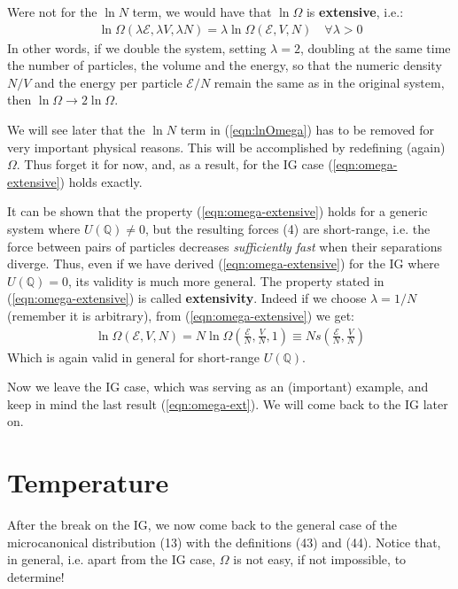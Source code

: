 \documentclass[../../main.tex]{subfiles}
\begin{document}
Were not for the $\ln N$ term, we would have that $\ln \Omega$ is \textbf{extensive}, i.e.:
\begin{align}\label{eqn:omega-extensive}
    \ln \Omega(\lambda \mathcal{E}, \lambda V, \lambda N) = \lambda \ln \Omega(\mathcal{E}, V, N) \quad \forall \lambda > 0
\end{align} 
In other words, if we double the system, setting $\lambda=2$, doubling at the same time the number of particles, the volume and the energy, so that the numeric density $N/V$ and the energy per particle $\mathcal{E}/N$ remain the same as in the original system, then $\ln \Omega \to 2 \ln \Omega$.

\medskip

We will see later that the $\ln N$ term in (\ref{eqn:lnOmega}) has to be removed for very important physical reasons. This will be accomplished by redefining (again) $\Omega$. Thus forget it for now, and, as a result, for the IG case (\ref{eqn:omega-extensive}) holds exactly.
\medskip

It can be shown that the property (\ref{eqn:omega-extensive}) holds for a generic system where $U(\mathbb{Q}) \neq 0$, but the resulting forces (4) are short-range, i.e. the force between pairs of particles decreases \textit{sufficiently fast} when their separations diverge. Thus, even if we have derived (\ref{eqn:omega-extensive}) for the IG where $U(\mathbb{Q}) = 0$, its validity is much more general. The property stated in (\ref{eqn:omega-extensive}) is called \textbf{extensivity}. Indeed if we choose $\lambda = 1/N$ (remember it is arbitrary), from (\ref{eqn:omega-extensive})  we get:
\begin{align}\label{eqn:omega-ext}
    \ln \Omega(\mathcal{E}, V, N) = N \ln \Omega\left(\frac{\mathcal{E}}{N}, \frac{V}{N}, 1  \right) \equiv N s\left(\frac{\mathcal{E}}{N}, \frac{V}{N}  \right)
\end{align}
Which is again valid in general for short-range $U(\mathbb{Q})$.

\medskip

Now we leave the IG case, which was serving as an (important) example, and keep in mind the last result (\ref{eqn:omega-ext}). We will come back to the IG later on.

\section{Temperature}
After the break on the IG, we now come back to the general case of the microcanonical distribution (13) with the definitions (43) and (44). Notice that, in general, i.e. apart from the IG case, $\Omega$ is not easy, if not impossible, to determine!
\end{document}
